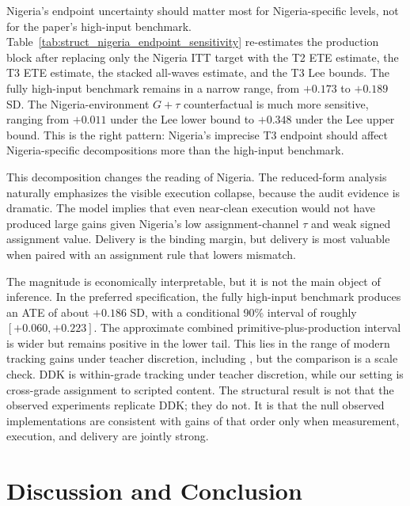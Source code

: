 \documentclass[11pt]{article}
\begin{document}


Nigeria's endpoint uncertainty should matter most for Nigeria-specific levels, not for the paper's high-input benchmark. Table~\ref{tab:struct_nigeria_endpoint_sensitivity} re-estimates the production block after replacing only the Nigeria ITT target with the T2 ETE estimate, the T3 ETE estimate, the stacked all-waves estimate, and the T3 Lee bounds. The fully high-input benchmark remains in a narrow range, from $+0.173$ to $+0.189$ SD. The Nigeria-environment $G+\tau$ counterfactual is much more sensitive, ranging from $+0.011$ under the Lee lower bound to $+0.348$ under the Lee upper bound. This is the right pattern: Nigeria's imprecise T3 endpoint should affect Nigeria-specific decompositions more than the high-input benchmark.



This decomposition changes the reading of Nigeria. The reduced-form analysis naturally emphasizes the visible execution collapse, because the audit evidence is dramatic. The model implies that even near-clean execution would not have produced large gains given Nigeria's low assignment-channel $\tau$ and weak signed assignment value. Delivery is the binding margin, but delivery is most valuable when paired with an assignment rule that lowers mismatch.

The magnitude is economically interpretable, but it is not the main object of inference. In the preferred specification, the fully high-input benchmark produces an ATE of about $+0.186$ SD, with a conditional 90\% interval of roughly $[+0.060,+0.223]$. The approximate combined primitive-plus-production interval is wider but remains positive in the lower tail. This lies in the range of modern tracking gains under teacher discretion, including \citet{duflo2011peer}, but the comparison is a scale check. DDK is within-grade tracking under teacher discretion, while our setting is cross-grade assignment to scripted content. The structural result is not that the observed experiments replicate DDK; they do not. It is that the null observed implementations are consistent with gains of that order only when measurement, execution, and delivery are jointly strong.

\section{Discussion and Conclusion}
\label{sec:conclusion}
\end{document}
